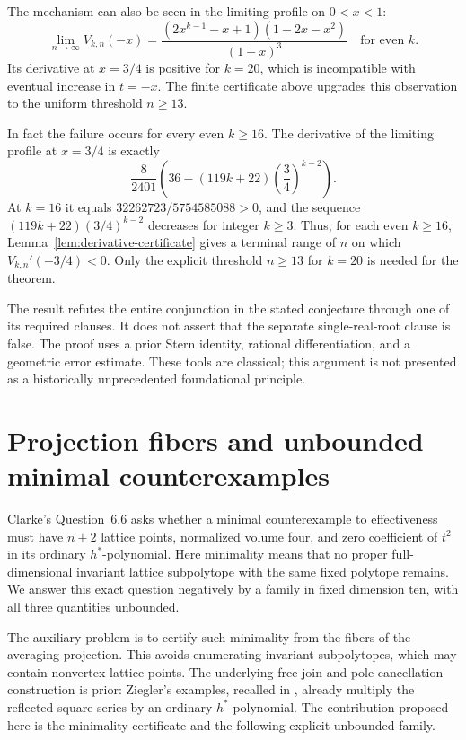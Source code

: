 \documentclass[11pt,a4paper]{article}
\theoremstyle{definition}\newtheorem{definition}[lemma]{Definition}
\theoremstyle{remark}\newtheorem{remark}[lemma]{Remark}
\begin{document}
The mechanism can also be seen in the limiting profile on $0<x<1$:
\[
 \lim_{n\to\infty}V_{k,n}(-x)
 =\frac{(2x^{k-1}-x+1)(1-2x-x^2)}{(1+x)^3}
 \quad\text{for even }k.
\]
Its derivative at $x=3/4$ is positive for $k=20$, which is incompatible
with eventual increase in $t=-x$. The finite certificate above upgrades
this observation to the uniform threshold $n\geq13$.

In fact the failure occurs for every even $k\geq16$. The derivative of
the limiting profile at $x=3/4$ is exactly
\[
 \frac{8}{2401}\left(36-(119k+22)\left(\frac34\right)^{k-2}\right).
\]
At $k=16$ it equals $32262723/5754585088>0$, and the sequence
$(119k+22)(3/4)^{k-2}$ decreases for integer $k\geq3$. Thus, for each
even $k\geq16$, Lemma~\ref{lem:derivative-certificate} gives a terminal
range of $n$ on which $V_{k,n}'(-3/4)<0$. Only the explicit threshold
$n\geq13$ for $k=20$ is needed for the theorem.

The result refutes the entire conjunction in the stated conjecture through
one of its required clauses. It does not assert that the separate
single-real-root clause is false. The proof uses a prior Stern identity,
rational differentiation, and a geometric error estimate. These tools are
classical; this argument is not presented as a historically unprecedented
foundational principle.

\section{Projection fibers and unbounded minimal counterexamples}
\label{sec:minimal-counterexamples}

Clarke's Question~6.6 \cite{Clarke26} asks whether a minimal counterexample
to effectiveness must have $n+2$ lattice points, normalized volume four,
and zero coefficient of $t^2$ in its ordinary $h^*$-polynomial. Here
minimality means that no proper full-dimensional invariant lattice
subpolytope with the same fixed polytope remains. We answer this exact
question negatively by a family in fixed dimension ten, with all three
quantities unbounded.

The auxiliary problem is to certify such minimality from the fibers of
the averaging projection. This avoids enumerating invariant subpolytopes,
which may contain nonvertex lattice points. The underlying free-join and
pole-cancellation construction is prior: Ziegler's examples, recalled in
\cite[Example~9.2]{Clarke26}, already multiply the reflected-square series
by an ordinary $h^*$-polynomial. The contribution proposed here is the
minimality certificate and the following explicit unbounded family.
\end{document}
